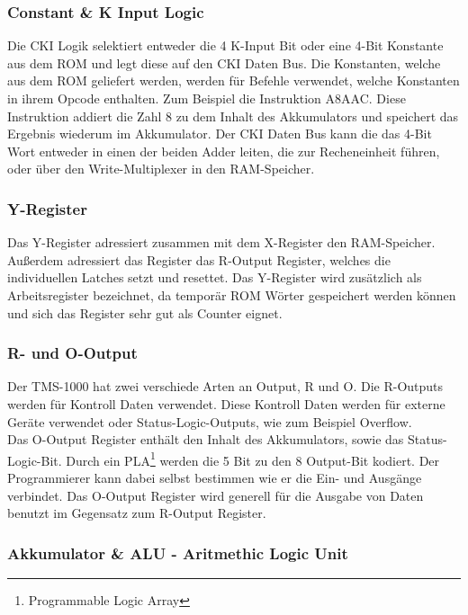 \subsubsection{Constant \& K Input Logic}

Die CKI Logik selektiert entweder die 4 K-Input Bit oder eine 4-Bit Konstante aus dem ROM und legt diese auf den CKI Daten Bus. Die Konstanten, welche aus dem ROM geliefert werden, werden f{\"u}r Befehle verwendet, welche Konstanten in ihrem Opcode enthalten. Zum Beispiel die Instruktion A8AAC. Diese Instruktion addiert die Zahl 8 zu dem Inhalt des Akkumulators und speichert das Ergebnis wiederum im Akkumulator. Der CKI Daten Bus kann die das 4-Bit Wort entweder in einen der beiden Adder leiten, die zur Recheneinheit f{\"u}hren, oder {\"u}ber den Write-Multiplexer in den RAM-Speicher.

\subsubsection{Y-Register}

Das Y-Register adressiert zusammen mit dem X-Register den RAM-Speicher. Au{\ss}erdem adressiert das Register das R-Output Register, welches die individuellen Latches setzt und resettet. Das Y-Register wird zus{\"a}tzlich als Arbeitsregister bezeichnet, da tempor{\"a}r ROM W{\"o}rter gespeichert werden k{\"o}nnen und sich das Register sehr gut als Counter eignet.

\subsubsection{R- und O-Output}

Der TMS-1000 hat zwei verschiede Arten an Output, R und O. Die R-Outputs werden f{\"u}r Kontroll Daten verwendet. Diese Kontroll Daten werden f{\"u}r externe Ger{\"a}te verwendet oder Status-Logic-Outputs, wie zum Beispiel Overflow. \\
Das O-Output Register enth{\"a}lt den Inhalt des Akkumulators, sowie das Status-Logic-Bit. Durch ein PLA\footnote{Programmable Logic Array} werden die 5 Bit zu den 8 Output-Bit kodiert. Der Programmierer kann dabei selbst bestimmen wie er die Ein- und Ausg{\"a}nge verbindet. Das O-Output Register wird generell f{\"u}r die Ausgabe von Daten benutzt im Gegensatz zum R-Output Register.

\subsubsection{Akkumulator \& ALU - Aritmethic Logic Unit}

